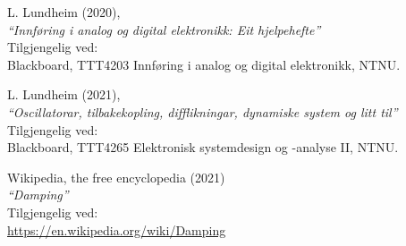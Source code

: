 \documentclass[a4paper,11pt,norsk]{article}
\begin{document}
\newpage

\begin{thebibliography}{9}
    L. Lundheim (2020), \\
    \emph{“Innføring i analog og digital elektronikk: Eit hjelpehefte”}\\
    Tilgjengelig ved: \\
    Blackboard, TTT4203 Innføring i analog og digital elektronikk, NTNU.

L. Lundheim (2021), \\
\emph{“Oscillatorar, tilbakekopling, difflikningar, dynamiske system og litt til”} \\
Tilgjengelig ved: \\
Blackboard, TTT4265 Elektronisk systemdesign og -analyse II, NTNU.


Wikipedia, the free encyclopedia (2021) \\
\emph{“Damping”} \\
Tilgjengelig ved: \\
\href{https://en.wikipedia.org/wiki/Damping}{https://en.wikipedia.org/wiki/Damping}
\end{thebibliography}

\newpage

\appendix
\end{document}
